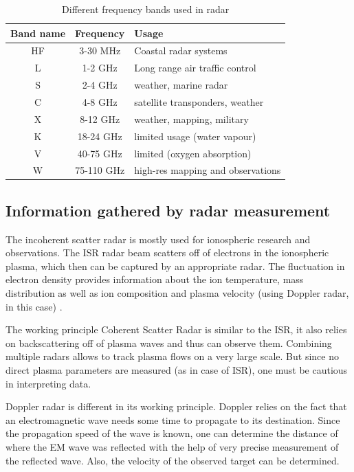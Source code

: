 \begin{table}[h!]
\centering
\caption{Different frequency bands used in radar}
\label{tab:bands}
\begin{tabular}{|c|c|l|}
\hline
\textbf{Band name} & \textbf{Frequency} & \textbf{Usage}                    \\ \hline
HF                 & 3-30 MHz           & Coastal radar systems             \\ \hline
L                  & 1-2 GHz            & Long range air traffic control    \\ \hline
S                  & 2-4 GHz            & weather, marine radar             \\ \hline
C                  & 4-8 GHz            & satellite transponders, weather   \\ \hline
X                  & 8-12 GHz           & weather, mapping, military        \\ \hline
K                  & 18-24 GHz          & limited usage (water vapour)      \\ \hline
V                  & 40-75 GHz          & limited (oxygen absorption)       \\ \hline
W                  & 75-110 GHz         & high-res mapping and observations \\ \hline
\end{tabular}
\end{table}


\subsection{Information gathered by radar measurement}

The incoherent scatter radar is mostly used for ionospheric research and observations. The ISR radar beam scatters off of electrons in the ionospheric plasma, which then can be captured by an appropriate radar. The fluctuation in electron density provides information about the ion temperature, mass distribution as well as ion composition and plasma velocity (using Doppler radar, in this case) \citep{gordon1958incoherent}.

The working principle Coherent Scatter Radar is similar to the ISR, it also relies on backscattering off of plasma waves and thus can observe them. Combining multiple radars allows to track plasma flows on a very large scale. But since no direct plasma parameters are measured (as in case of ISR), one must be cautious in interpreting data. 

Doppler radar is different in its working principle. Doppler relies on the fact that an electromagnetic wave needs some time to propagate to its destination. Since the propagation speed of the wave is known, one can determine the distance of where the EM wave was reflected with the help of very precise measurement of the reflected wave. Also, the velocity of the observed target can be determined.



